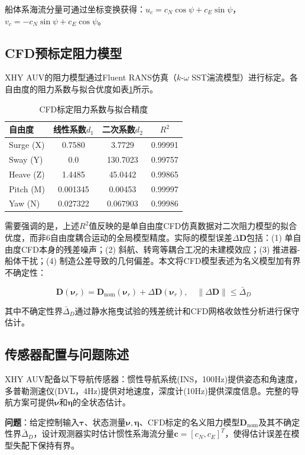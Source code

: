 船体系海流分量可通过坐标变换获得：$u_c = c_N\cos\psi + c_E\sin\psi$，$v_c = -c_N\sin\psi + c_E\cos\psi$。

\subsection{CFD预标定阻力模型}

XHY AUV的阻力模型通过Fluent RANS仿真（$k$-$\omega$ SST湍流模型）进行标定。各自由度的阻力系数与拟合优度如表\ref{tab:cfd}所示。

\begin{table}[h]
\centering
\caption{CFD标定阻力系数与拟合精度}
\label{tab:cfd}
\begin{tabular}{lccc}
\toprule
自由度 & 线性系数$d_1$ & 二次系数$d_2$ & $R^2$ \\
\midrule
Surge (X)  & 0.7580  & 3.7729   & 0.99991 \\
Sway (Y)   & 0.0     & 130.7023 & 0.99757 \\
Heave (Z)  & 1.4485  & 45.0442  & 0.99865 \\
Pitch (M)  & 0.001345 & 0.00453 & 0.99997 \\
Yaw (N)    & 0.027322 & 0.067903 & 0.99986 \\
\bottomrule
\end{tabular}
\end{table}

需要强调的是，上述$R^2$值反映的是单自由度CFD仿真数据对二次阻力模型的拟合优度，而非6自由度耦合运动的全局模型精度。实际的模型误差$\Delta\bm{D}$包括：(1) 单自由度CFD本身的残差噪声；(2) 斜航、转弯等耦合工况的未建模效应；(3) 推进器-船体干扰；(4) 制造公差导致的几何偏差。本文将CFD模型表述为名义模型加有界不确定性：

\begin{equation}
    \bm{D}(\bm{\nu}_r) = \bm{D}_{\text{nom}}(\bm{\nu}_r) + \Delta\bm{D}(\bm{\nu}_r), \quad \|\Delta\bm{D}\| \leq \bar{\Delta}_D
    \label{eq:uncertainty}
\end{equation}

其中不确定性界$\bar{\Delta}_D$通过静水拖曳试验的残差统计和CFD网格收敛性分析进行保守估计。

\subsection{传感器配置与问题陈述}

XHY AUV配备以下导航传感器：惯性导航系统(INS，100Hz)提供姿态和角速度，多普勒测速仪(DVL，4Hz)提供对地速度，深度计(10Hz)提供深度信息。完整的导航方案可提供$\bm{\nu}$和$\bm{\eta}$的全状态估计。

\textbf{问题}：给定控制输入$\bm{\tau}$、状态测量$\bm{\nu},\bm{\eta}$、CFD标定的名义阻力模型$\bm{D}_{\text{nom}}$及其不确定性界$\bar{\Delta}_D$，设计观测器实时估计惯性系海流分量$\bm{c}=[c_N,c_E]^T$，使得估计误差在模型失配下保持有界。
